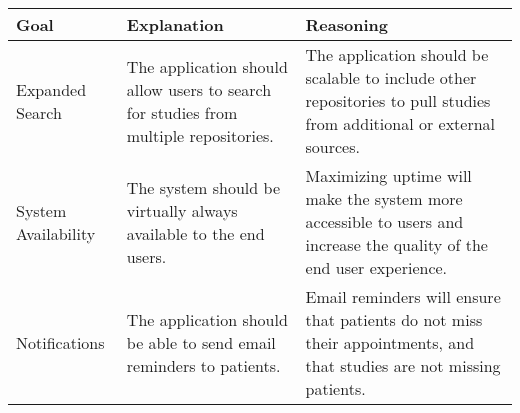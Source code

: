 \documentclass{article}
\begin{document}
\begin{table}[H]
\centering
\begin{tabular}{| p{3cm} | p{5cm} | p{5cm} |}
\hline
Goal & Explanation & Reasoning \\
\hline  \hline
Expanded Search & The application should allow users to search for studies from multiple repositories. & The application should be scalable to include other repositories to pull studies from additional or external sources. \\
\hline
System Availability & The system should be virtually always available to the end users. & Maximizing uptime will make the system more accessible to users and increase the quality of the end user experience. \\
\hline
Notifications & The application should be able to send email reminders to patients. & Email reminders will ensure that patients do not miss their appointments, and that studies are not missing patients. \\
\hline

\end{tabular}
\end{table}
\end{document}
